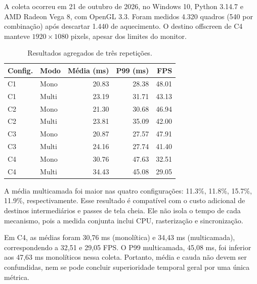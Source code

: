 A coleta ocorreu em 21 de outubro de 2026, no Windows 10, Python 3.14.7 e AMD Radeon Vega 8, com OpenGL 3.3. Foram medidos 4.320 quadros (540 por combinação) após descartar 1.440 de aquecimento. O destino offscreen de C4 manteve $1920\times1080$ pixels, apesar dos limites do monitor.

\begin{table}[t]

\centering

\caption{Resultados agregados de três repetições.}

\label{tab:resultados}

\begin{tabular}{llrrr}

\toprule

Config. & Modo & Média (ms) & P99 (ms) & FPS \\

\midrule

C1 & Mono & 20.83 & 28.38 & 48.01 \\

C1 & Multi & 23.19 & 31.71 & 43.13 \\

C2 & Mono & 21.30 & 30.68 & 46.94 \\

C2 & Multi & 23.81 & 35.09 & 42.00 \\

C3 & Mono & 20.87 & 27.57 & 47.91 \\

C3 & Multi & 24.16 & 27.74 & 41.40 \\

C4 & Mono & 30.76 & 47.63 & 32.51 \\

C4 & Multi & 34.43 & 45.08 & 29.05 \\

\bottomrule

\end{tabular}

\end{table}

A média multicamada foi maior nas quatro configurações: 11.3\%, 11.8\%, 15.7\%, 11.9\%, respectivamente. Esse resultado é compatível com o custo adicional de destinos intermediários e passes de tela cheia. Ele não isola o tempo de cada mecanismo, pois a medida conjunta inclui CPU, rasterização e sincronização.

Em C4, as médias foram 30,76 ms (monolítica) e 34,43 ms (multicamada), correspondendo a 32,51 e 29,05 FPS. O P99 multicamada, 45,08 ms, foi inferior aos 47,63 ms monolíticos nessa coleta. Portanto, média e cauda não devem ser confundidas, nem se pode concluir superioridade temporal geral por uma única métrica.

